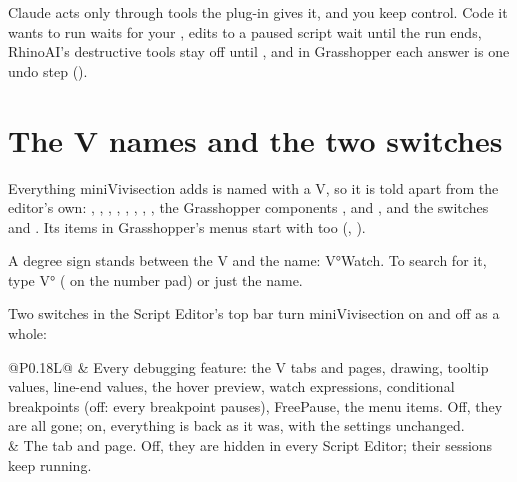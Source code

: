 Claude acts only through tools the plug-in gives it, and you keep control. Code it wants to run waits
for your , edits to a paused script wait until the run ends, RhinoAI's destructive tools stay
off until , and in Grasshopper each answer is one undo step ().

\section{The V names and the two switches}\label{sec:vnames}

Everything miniVivisection adds is named with a V, so it is told apart from the editor's own:
, , , , , , , ,
the Grasshopper components ,  and , and the switches  and .
Its items in Grasshopper's menus start with  too (, ).

A degree sign stands between the V and the name: V°Watch. To search for it, type V° ( on the number pad) or just the name.

Two switches in the Script Editor's top bar turn miniVivisection on and off as a whole:

\begin{xltabular}{\linewidth}{@{}P{0.18\linewidth}L@{}}
\toprule
{} & Every debugging feature: the V tabs and pages, drawing, tooltip values, line-end values,
             the hover preview, watch expressions, conditional breakpoints (off: every breakpoint pauses),
             FreePause, the menu items. Off, they are all gone; on, everything is back as it was, with the
             settings unchanged. \\
    & The  tab and page. Off, they are hidden in every Script Editor; their sessions keep running. \\
\bottomrule
\end{xltabular}
